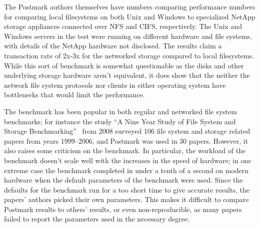The Postmark authors themselves have numbers comparing performance numbers for comparing local filesystems on both Unix and Windows
to specialized NetApp storage appliances connected over NFS and CIFS, respectively.
The Unix and Windows servers in the test were running on different hardware and file systems,
with details of the NetApp hardware not disclosed.
The results claim a transaction rate of 2x-3x for the networked storage compared to local filesystems.
While this sort of benchmark is somewhat questionable as the disks and other underlying storage hardware aren't equivalent,
it does show that the neither the network file system protocols nor clients in either operating system have
bottlenecks that would limit the performance.

The benchmark has been popular in both regular and networked file system benchmarks;
for instance the study ``A Nine Year Study of File System and Storage Benchmarking''~\cite{MetaStudy} from 2008
surveyed 106 file system and storage related papers from years 1999--2006, and Postmark was used in 30 papers.
However, it also raises some criticism on the benchmark.
In particular, the workload of the benchmark doesn't scale well with the increases in the speed of hardware;
in one extreme case the benchmark completed in under a tenth of a second on modern hardware when the default parameters
of the benchmark were used.
Since the defaults for the benchmark run for a too short time to give accurate results,
the papers' authors picked their own parameters.
This makes it difficult to compare Postmark results to others' results,
or even non-reproducible, as many papers failed to report the parameters used in the necessary degree.

